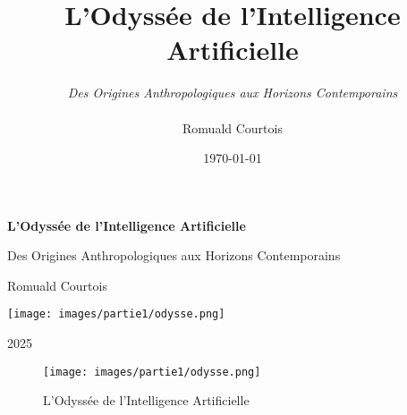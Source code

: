 \documentclass[12pt,a4paper]{book}
\begin{document}
\begin{titlepage}
    \centering
    \vspace*{1cm}
    \Huge
    \textbf{L'Odyssée de l'Intelligence Artificielle}
    
    \vspace{0.5cm}
    \LARGE
    Des Origines Anthropologiques aux Horizons Contemporains
    
    \vfill
    \Large
    Romuald Courtois
    
    \vspace{0.8cm}
    
    \texttt{[image: images/partie1/odysse.png]}
    
    \vfill
    
    \large
    2025

\end{titlepage}

\title{L'Odyssée de l'Intelligence Artificielle}

\begin{figure}[h]
  \centering
  \texttt{[image: images/partie1/odysse.png]}
  \caption{L'Odyssée de l'Intelligence Artificielle}
\end{figure}

\author{\textit{Des Origines Anthropologiques aux Horizons Contemporains} \\ \\ Romuald Courtois}

\date{\today}


\maketitle

\newpage
\end{document}
